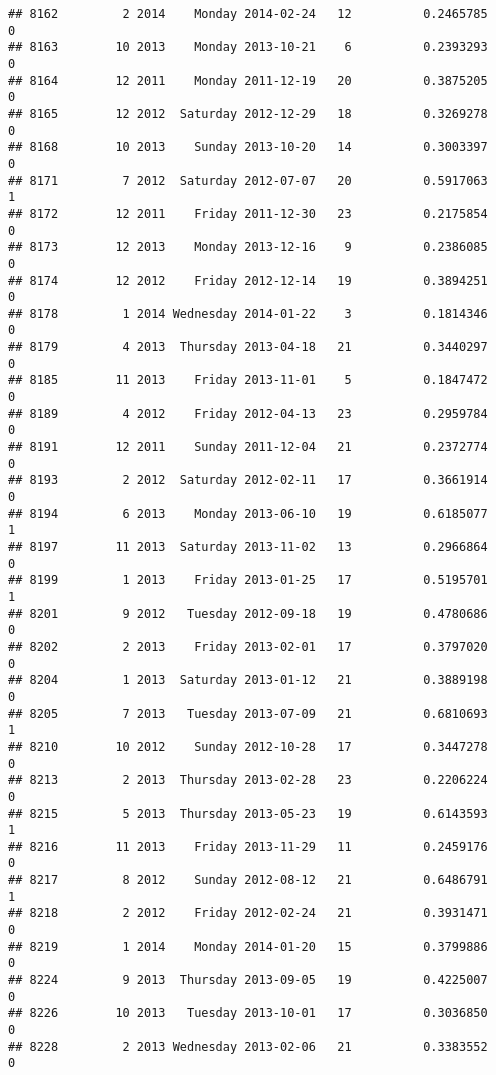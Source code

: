\documentclass[
]{article}
\begin{document}
\begin{verbatim}
## 8162         2 2014    Monday 2014-02-24   12          0.2465785             0
## 8163        10 2013    Monday 2013-10-21    6          0.2393293             0
## 8164        12 2011    Monday 2011-12-19   20          0.3875205             0
## 8165        12 2012  Saturday 2012-12-29   18          0.3269278             0
## 8168        10 2013    Sunday 2013-10-20   14          0.3003397             0
## 8171         7 2012  Saturday 2012-07-07   20          0.5917063             1
## 8172        12 2011    Friday 2011-12-30   23          0.2175854             0
## 8173        12 2013    Monday 2013-12-16    9          0.2386085             0
## 8174        12 2012    Friday 2012-12-14   19          0.3894251             0
## 8178         1 2014 Wednesday 2014-01-22    3          0.1814346             0
## 8179         4 2013  Thursday 2013-04-18   21          0.3440297             0
## 8185        11 2013    Friday 2013-11-01    5          0.1847472             0
## 8189         4 2012    Friday 2012-04-13   23          0.2959784             0
## 8191        12 2011    Sunday 2011-12-04   21          0.2372774             0
## 8193         2 2012  Saturday 2012-02-11   17          0.3661914             0
## 8194         6 2013    Monday 2013-06-10   19          0.6185077             1
## 8197        11 2013  Saturday 2013-11-02   13          0.2966864             0
## 8199         1 2013    Friday 2013-01-25   17          0.5195701             1
## 8201         9 2012   Tuesday 2012-09-18   19          0.4780686             0
## 8202         2 2013    Friday 2013-02-01   17          0.3797020             0
## 8204         1 2013  Saturday 2013-01-12   21          0.3889198             0
## 8205         7 2013   Tuesday 2013-07-09   21          0.6810693             1
## 8210        10 2012    Sunday 2012-10-28   17          0.3447278             0
## 8213         2 2013  Thursday 2013-02-28   23          0.2206224             0
## 8215         5 2013  Thursday 2013-05-23   19          0.6143593             1
## 8216        11 2013    Friday 2013-11-29   11          0.2459176             0
## 8217         8 2012    Sunday 2012-08-12   21          0.6486791             1
## 8218         2 2012    Friday 2012-02-24   21          0.3931471             0
## 8219         1 2014    Monday 2014-01-20   15          0.3799886             0
## 8224         9 2013  Thursday 2013-09-05   19          0.4225007             0
## 8226        10 2013   Tuesday 2013-10-01   17          0.3036850             0
## 8228         2 2013 Wednesday 2013-02-06   21          0.3383552             0

\end{verbatim}
\end{document}
